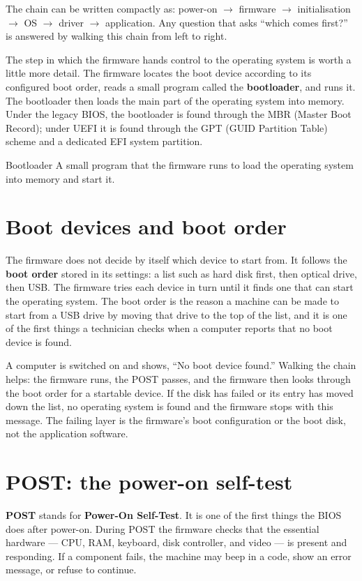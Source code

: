 The chain can be written compactly as: power-on $\rightarrow$ firmware
$\rightarrow$ initialisation $\rightarrow$ OS $\rightarrow$ driver
$\rightarrow$ application. Any question that asks ``which comes first?'' is
answered by walking this chain from left to right.

The step in which the firmware hands control to the operating system is worth
a little more detail. The firmware locates the boot device according to its
configured boot order, reads a small program called the
\textbf{bootloader}, and runs it. The bootloader then loads the main part of
the operating system into memory. Under the legacy BIOS, the bootloader is
found through the MBR (Master Boot Record); under UEFI it is found through
the GPT (GUID Partition Table) scheme and a dedicated EFI system partition.

\begin{definitionbox}{Bootloader}
A small program that the firmware runs to load the operating system into
memory and start it.
\end{definitionbox}

\section{Boot devices and boot order}
The firmware does not decide by itself which device to start from. It follows
the \textbf{boot order} stored in its settings: a list such as hard disk
first, then optical drive, then USB. The firmware tries each device in turn
until it finds one that can start the operating system. The boot order is the
reason a machine can be made to start from a USB drive by moving that drive
to the top of the list, and it is one of the first things a technician checks
when a computer reports that no boot device is found.

\begin{example}
A computer is switched on and shows, ``No boot device found.'' Walking the
chain helps: the firmware runs, the POST passes, and the firmware then looks
through the boot order for a startable device. If the disk has failed or its
entry has moved down the list, no operating system is found and the firmware
stops with this message. The failing layer is the firmware's boot
configuration or the boot disk, not the application software.
\end{example}

\section{POST: the power-on self-test}
\textbf{POST} stands for \textbf{Power-On Self-Test}. It is one of the first
things the BIOS does after power-on. During POST the firmware checks that the
essential hardware --- CPU, RAM, keyboard, disk controller, and video --- is
present and responding. If a component fails, the machine may beep in a code,
show an error message, or refuse to continue.

